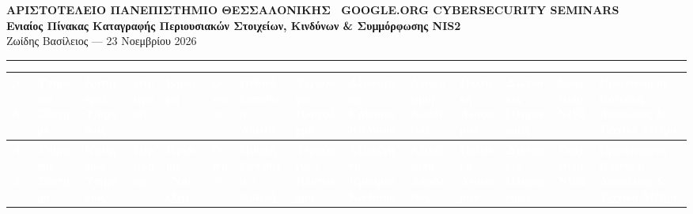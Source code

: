 \documentclass[10pt, a4paper]{article}
\begin{document}
{\fontsize{7.5pt}{9pt}\selectfont\color{mutedgray}\textbf{ΑΡΙΣΤΟΤΕΛΕΙΟ ΠΑΝΕΠΙΣΤΗΜΙΟ ΘΕΣΣΑΛΟΝΙΚΗΣ \textbar\ GOOGLE.ORG CYBERSECURITY SEMINARS}}\\[2pt]
{\fontsize{13pt}{16pt}\selectfont\color{primaryblue}\textbf{Ενιαίος Πίνακας Καταγραφής Περιουσιακών Στοιχείων, Κινδύνων \& Συμμόρφωσης NIS2}}\\[2pt]
{\fontsize{8.5pt}{11pt}\selectfont\color{medslate}Ζωίδης Βασίλειος — 23 Νοεμβρίου 2026}\\[1pt]
{\color{accentblue}\hrule height 1.1pt}
\vspace{3pt}

{\fontsize{6.8pt}{8.5pt}\selectfont
\setlength{\tabcolsep}{2.3pt}
\renewcommand{\arraystretch}{1.28}
\setlength{\extrarowheight}{1.2pt}

\begin{longtable}{|
  >{\centering\arraybackslash}p{6.0mm}|
  >{\RaggedRight\arraybackslash}p{20.0mm}|
  >{\RaggedRight\arraybackslash}p{14.5mm}|
  >{\RaggedRight\arraybackslash}p{21.0mm}|
  >{\centering\arraybackslash}p{9.5mm}|
  >{\RaggedRight\arraybackslash}p{14.0mm}|
  >{\RaggedRight\arraybackslash}p{24.0mm}|
  >{\RaggedRight\arraybackslash}p{17.5mm}|
  >{\RaggedRight\arraybackslash}p{23.0mm}|
  >{\RaggedRight\arraybackslash}p{13.0mm}|
  >{\RaggedRight\arraybackslash}p{15.5mm}|
  >{\RaggedRight\arraybackslash}p{18.0mm}|
  >{\RaggedRight\arraybackslash}p{11.5mm}|
  >{\RaggedRight\arraybackslash}p{45.5mm}|}

\hline
\rowcolor{primaryblue}
\textcolor{white}{\textbf{Α/Α}} &
\textcolor{white}{\textbf{Υπηρεσία / Σύστημα}} &
\textcolor{white}{\textbf{Κατηγορία Υπηρεσίας}} &
\textcolor{white}{\textbf{Περιγραφή}} &
\textcolor{white}{\textbf{Κρίσιμη}} &
\textcolor{white}{\textbf{Owner}} &
\textcolor{white}{\textbf{Πιθανή Ευπάθεια / Απειλή}} &
\textcolor{white}{\textbf{Τεχνολογία / Πλατφόρμα}} &
\textcolor{white}{\textbf{Αξιολόγηση Κρίσιμου Κινδύνου}} &
\textcolor{white}{\textbf{Αξιολόγηση Ασφάλειας}} &
\textcolor{white}{\textbf{Πολιτική Αναφορών}} &
\textcolor{white}{\textbf{Δικτυακές Πληροφορίες}} &
\textcolor{white}{\textbf{Συσχέτιση NIS2}} &
\textcolor{white}{\textbf{Προτεινόμενη Πολιτική Ασφαλείας \& Τεχνικά Μέτρα}} \\
\hline
\endfirsthead

\hline
\rowcolor{primaryblue}
\textcolor{white}{\textbf{Α/Α}} &
\textcolor{white}{\textbf{Υπηρεσία / Σύστημα}} &
\textcolor{white}{\textbf{Κατηγορία Υπηρεσίας}} &
\textcolor{white}{\textbf{Περιγραφή}} &
\textcolor{white}{\textbf{Κρίσιμη (Ναι/Όχι)}} &
\textcolor{white}{\textbf{Owner}} &
\textcolor{white}{\textbf{Πιθανή Ευπάθεια / Απειλή}} &
\textcolor{white}{\textbf{Τεχνολογία / Πλατφόρμα}} &
\textcolor{white}{\textbf{Αξιολόγηση Κρίσιμου Κινδύνου}} &
\textcolor{white}{\textbf{Αξιολόγηση Ασφάλειας}} &
\textcolor{white}{\textbf{Πολιτική Αναφορών}} &
\textcolor{white}{\textbf{Δικτυακές Πληροφορίες}} &
\textcolor{white}{\textbf{Συσχέτιση NIS2}} &
\textcolor{white}{\textbf{Προτεινόμενη Πολιτική Ασφαλείας \& Τεχνικά Μέτρα}} \\
\hline
\endhead


\end{longtable}}
\end{document}
